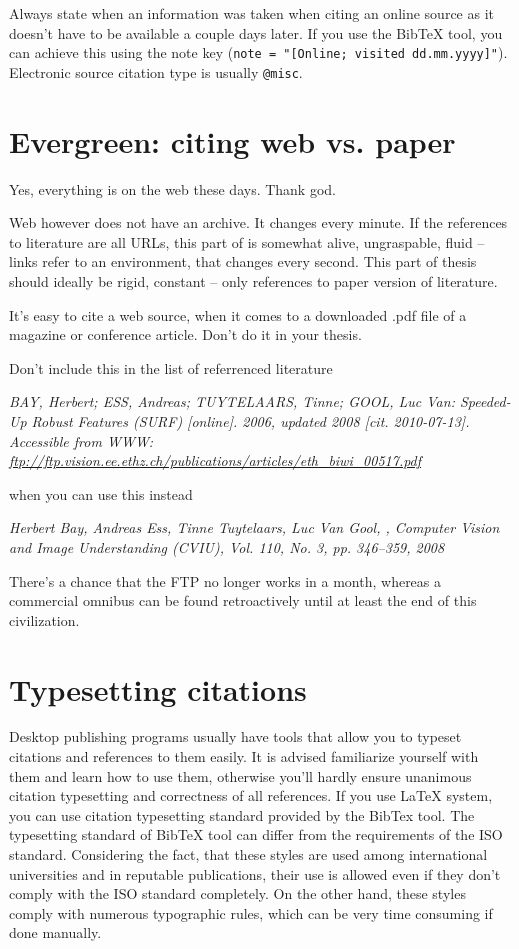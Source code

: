 {{Always state when an information was taken when citing an online source as it doesn't have to be available a couple days later. If you use the BibTeX tool, you can achieve this using the note key (\verb|note = "[Online; visited dd.mm.yyyy]"|). Electronic source citation type is usually \verb|@misc|.

\section{Evergreen: citing web vs. paper}

Yes, everything is on the web these days. Thank god.

Web however does not have an archive. It changes every minute. If the references to literature are all URLs, this part of is somewhat alive, ungraspable, fluid -- links refer to an environment, that changes every second. This part of thesis should ideally be rigid, constant -- only references to paper version of literature.

It's easy to cite a web source, when it comes to a downloaded .pdf file of a magazine or conference article. Don't do it in your thesis.
\bigskip

\noindent Don't include this in the list of referrenced literature

\noindent \it BAY, Herbert; ESS, Andreas; TUYTELAARS, Tinne; GOOL, Luc Van: Speeded-Up Robust Features (SURF) [online]. 2006, updated 2008 [cit. 2010-07-13]. Accessible from WWW: \url{ftp://ftp.vision.ee.ethz.ch/publications/articles/eth\_biwi\_00517.pdf}
\bigskip
\rm

\noindent when you can use this instead

\noindent \it Herbert Bay, Andreas Ess, Tinne Tuytelaars, Luc Van Gool, , Computer Vision and Image Understanding (CVIU), Vol. 110, No. 3, pp. 346–359, 2008
\bigskip
\rm

There's a chance that the FTP no longer works in a month, whereas a commercial omnibus can be found retroactively until at least the end of this civilization.


\section{Typesetting citations}

Desktop publishing programs usually have tools that allow you to typeset citations and references to them easily. It is advised familiarize yourself with them and learn how to use them, otherwise you'll hardly ensure unanimous citation typesetting and correctness of all references. If you use LaTeX system, you can use citation typesetting standard provided by the BibTex tool. The typesetting standard of BibTeX tool can differ from the requirements of the ISO standard. Considering the fact, that these styles are used among international universities and in reputable publications, their use is allowed even if they don't comply with the ISO standard completely. On the other hand, these styles comply with numerous typographic rules, which can be very time consuming if done manually.

}}
